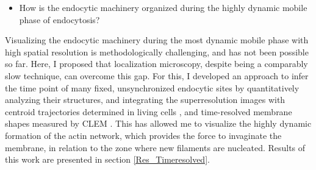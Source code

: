 \begin{itemize}
	\item How is the endocytic machinery organized during the highly dynamic mobile phase of endocytosis?
\end{itemize}

Visualizing the endocytic machinery during the most dynamic mobile phase with high spatial resolution is methodologically challenging, and has not been possible so far. Here, I proposed that localization microscopy, despite being a comparably slow technique, can overcome this gap. For this, I developed an approach to infer the time point of many fixed, unsynchronized endocytic sites by quantitatively analyzing their structures, and integrating the superresolution images with centroid trajectories determined in living cells \citep{Picco:2015iv}, and time-resolved membrane shapes measured by CLEM \citep{Kukulski:2012jl}. This has allowed me to visualize the highly dynamic formation of the actin network, which provides the force to invaginate the membrane, in relation to the zone where new filaments are nucleated. Results of this work are presented in section \ref{Res_Timeresolved}.